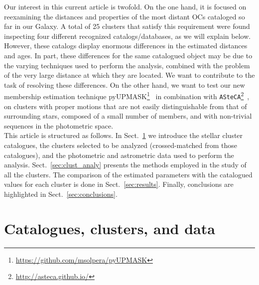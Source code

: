 \documentclass[referee]{aa}
\begin{document}
 Our interest in this current article is twofold. On the one hand, it is focused
 on reexamining the distances and properties of the most distant OCs cataloged
 so far in our Galaxy. A total of 25 clusters that satisfy this requirement were
 found inspecting four different recognized catalogs/databases, as we will
 explain below.
 However, these catalogs display enormous differences in the estimated distances
 and ages. In part, these differences for the same catalogued object may be due
 to the varying techniques used to perform the analysis, combined with
 the problem of the very large distance at which they are located.
 We want to contribute to the task of resolving these differences.
 On the other hand, we want to test our new membership estimation technique
 pyUPMASK\footnote{\url{https://github.com/msolpera/pyUPMASK}}~\citep{Pera_2021}
 in combination with
 \texttt{ASteCA}\footnote{\url{http://asteca.github.io/}}~\citep{Perren_2015},
 on clusters with proper motions that are not easily distinguishable from that
 of surrounding stars, composed of a small number of members, and with
 non-trivial sequences in the photometric space.\\


 This article is structured as follows. In Sect.~\ref{sec:cat_clust_data} we
 introduce the stellar cluster catalogues, the clusters selected to be
 analyzed (crossed-matched from those catalogues), and the photometric and
 astrometric data used to perform the analysis.
 Sect.~\ref{sec:clust_analy} presents the methods employed in the study of all the
 clusters. The comparison of the estimated parameters with the catalogued
 values for each cluster is done in Sect.~\ref{sec:results}. Finally,
 conclusions are highlighted in Sect.~\ref{sec:conclusions}.





\section{Catalogues, clusters, and data}
 \label{sec:cat_clust_data}
\end{document}
